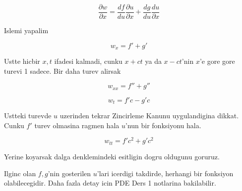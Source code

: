 \documentclass[12pt,fleqn]{article}\usepackage{../common}
\begin{document}
\[ \frac{\partial w}{\partial x}  = 
\frac{df}{du}
\frac{\partial u}{\partial x} + 
\frac{dg}{du}
\frac{du}{\partial x} 
\]

Islemi yapalim

\[ w_x = f' + g' \]

Ustte hicbir $x,t$ ifadesi kalmadi, cunku $x+ct$ ya da $x-ct$'nin $x$'e
gore gore turevi 1 sadece. Bir daha turev alirsak

\[ w_{xx} = f'' + g'' \]

\[ w_t = f'c - g'c \]

Ustteki turevde $u$ uzerinden tekrar Zincirleme Kanunu uygulandigina
dikkat. Cunku $f'$ turev olmasina ragmen hala $u$'nun bir fonksiyonu hala.

\[ w_{tt} = f'c^2 + g'c^2 \]

Yerine koyarsak dalga denklemindeki esitligin dogru oldugunu goruruz. 

Ilginc olan $f,g$'nin gosterilen $u$'lari icerdigi takdirde, herhangi bir
fonksiyon olabilecegidir. Daha fazla detay icin PDE Ders 1 notlarina
bakilabilir.
\end{document}
